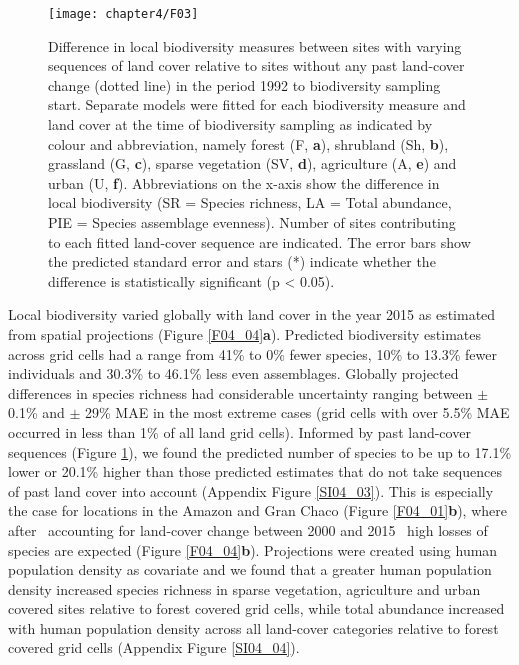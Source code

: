\begin{figure}[!hb]
\centering
\texttt{[image: chapter4/F03]}
\caption{ Difference in local biodiversity measures between sites with varying sequences of land cover relative to sites without any past land-cover change (dotted line) in the period 1992 to biodiversity sampling start. Separate models were fitted for each biodiversity measure and land cover at the time of biodiversity sampling as indicated by colour and abbreviation, namely forest (F, \textbf{a}), shrubland (Sh, \textbf{b}), grassland (G, \textbf{c}), sparse vegetation (SV, \textbf{d}), agriculture (A, \textbf{e}) and urban (U, \textbf{f}). Abbreviations on the x-axis show the difference in local biodiversity (SR = Species richness, LA = Total abundance, PIE = Species assemblage evenness). Number of sites contributing to each fitted land-cover sequence are indicated. The error bars show the predicted standard error and stars (*) indicate whether the difference is statistically significant (p < 0.05).}
\label{F04_03}
\end{figure}

Local biodiversity varied globally with land cover in the year 2015 as estimated from spatial projections (Figure \ref{F04_04}\textbf{a}). Predicted biodiversity estimates across grid cells had a range from 41\% to 0\% fewer species, 10\% to 13.3\% fewer individuals and 30.3\% to 46.1\% less even assemblages. Globally projected differences in species richness had considerable uncertainty ranging between $\pm$ 0.1\% and $\pm$ 29\% MAE in the most extreme cases (grid cells with over 5.5\% MAE occurred in less than 1\% of all land grid cells). Informed by past land-cover sequences (Figure \ref{F04_03}), we found the predicted number of species to be up to 17.1\% lower or 20.1\% higher than those predicted estimates that do not take sequences of past land cover into account (Appendix Figure \ref{SI04_03}). This is especially the case for locations in the Amazon and Gran Chaco (Figure \ref{F04_01}\textbf{b}), where after \textendash\ accounting for land-cover change between 2000 and 2015 \textendash\ high losses of species are expected (Figure \ref{F04_04}\textbf{b}). Projections were created using human population density as covariate and we found that a greater human population density increased species richness in sparse vegetation, agriculture and urban covered sites relative to forest covered grid cells, while total abundance increased with human population density across all land-cover categories relative to forest covered grid cells (Appendix Figure \ref{SI04_04}).

